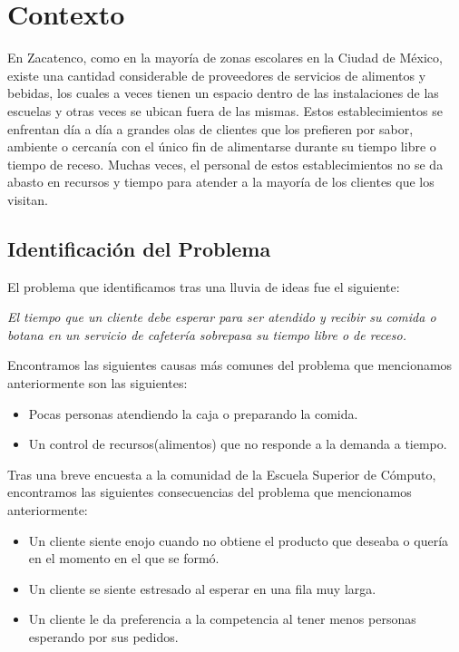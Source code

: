 
\section{Contexto}

En Zacatenco, como en la mayoría de zonas escolares en la Ciudad de México, existe una cantidad considerable de proveedores de servicios de alimentos y bebidas, los cuales a veces tienen un espacio dentro de las instalaciones de las escuelas y otras veces se ubican fuera de las mismas. Estos establecimientos se enfrentan día a día a grandes olas de clientes que los prefieren por sabor, ambiente o cercanía con el único fin de alimentarse durante su tiempo libre o tiempo de receso. Muchas veces, el personal de estos establecimientos no se da abasto en recursos y tiempo para atender a la mayoría de los clientes que los visitan.

\subsection{Identificación del Problema}

El problema que identificamos tras una lluvia de ideas fue el siguiente:\\

\begin{center}\textit{El tiempo que un cliente debe esperar para ser atendido y recibir su comida o botana en un servicio de cafetería sobrepasa su tiempo libre o de receso.}\end{center}

Encontramos las siguientes causas más comunes del problema que mencionamos anteriormente son las siguientes:
	\begin{itemize}
		\item Pocas personas atendiendo la caja o preparando la comida.
		\item Un control de recursos(alimentos) que no responde a la demanda a tiempo.
	\end{itemize}

Tras una breve encuesta a la comunidad de la Escuela Superior de Cómputo, encontramos las siguientes consecuencias del problema que mencionamos anteriormente:
	\begin{itemize}
		\item Un cliente siente enojo cuando no obtiene el producto que deseaba o quería en el momento en el que se formó.
		\item Un cliente se siente estresado al esperar en una fila muy larga.
		\item Un cliente le da preferencia a la competencia al tener menos personas esperando por sus pedidos.
	\end{itemize}
	
